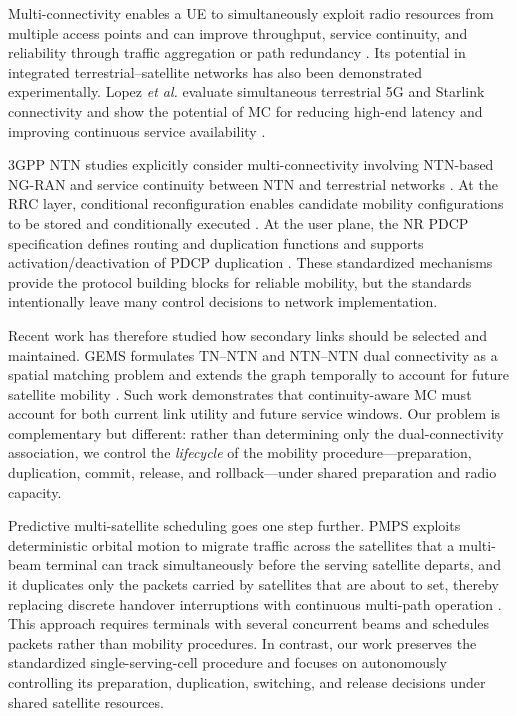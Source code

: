 \documentclass[journal]{IEEEtran}
\begin{document}
Multi-connectivity enables a UE to simultaneously exploit radio
resources from multiple access points and can improve throughput,
service continuity, and reliability through traffic aggregation or
path redundancy \cite{pupiales2021mc}. Its potential in integrated
terrestrial--satellite networks has also been demonstrated
experimentally. Lopez \emph{et al.} evaluate simultaneous terrestrial
5G and Starlink connectivity and show the potential of MC for reducing
high-end latency and improving continuous service availability
\cite{lopez2022empiricalmc}.

3GPP NTN studies explicitly consider multi-connectivity involving
NTN-based NG-RAN and service continuity between NTN and terrestrial
networks \cite{3gpp38821}. At the RRC layer, conditional
reconfiguration enables candidate mobility configurations to be stored
and conditionally executed \cite{3gpp38331}. At the user plane, the
NR PDCP specification defines routing and duplication functions and
supports activation/deactivation of PDCP duplication
\cite{3gpp38323}. These standardized mechanisms provide the protocol
building blocks for reliable mobility, but the standards intentionally
leave many control decisions to network implementation.

Recent work has therefore studied how secondary links should be
selected and maintained. GEMS formulates TN--NTN and NTN--NTN dual
connectivity as a spatial matching problem and extends the graph
temporally to account for future satellite mobility
\cite{wang2026gems}. Such work demonstrates that continuity-aware MC
must account for both current link utility and future service windows.
Our problem is complementary but different: rather than determining
only the dual-connectivity association, we control the
\emph{lifecycle} of the mobility procedure---preparation, duplication,
commit, release, and rollback---under shared preparation and radio
capacity.

Predictive multi-satellite scheduling goes one step further. PMPS exploits
deterministic orbital motion to migrate traffic across the satellites that a
multi-beam terminal can track simultaneously before the serving satellite
departs, and it duplicates only the packets carried by satellites that are
about to set, thereby replacing discrete handover interruptions with
continuous multi-path operation \cite{wang2026pmps}. This approach requires
terminals with several concurrent beams and schedules packets rather than
mobility procedures. In contrast, our work preserves the standardized
single-serving-cell procedure and focuses on autonomously controlling its
preparation, duplication, switching, and release decisions under shared
satellite resources.
\end{document}
